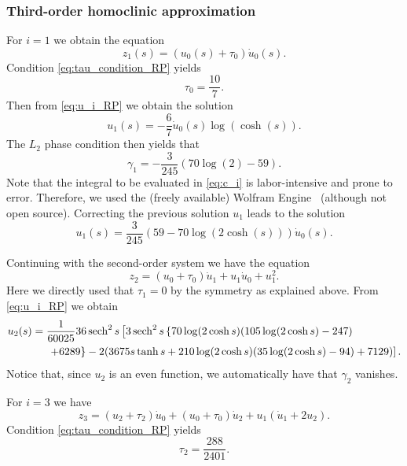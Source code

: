\subsubsection{Third-order homoclinic approximation}
\label{sec:third_order_homoclinic_approximation_RP}
For $i=1$ we obtain the equation
\begin{equation*}
    z_1(s) = (u_0(s)+\tau_0) \dot u_0(s).
\end{equation*}
Condition \cref{eq:tau_condition_RP} yields
\begin{equation*}
    \tau_0 = \frac{10}{7}.
\end{equation*}
Then from \cref{eq:u_i_RP} we obtain the solution
\begin{equation*}
    u_1(s) = -\frac{6}{7} \dot u_0(s) \log (\cosh (s)).
\end{equation*}
The $L_2$ phase condition then yields that
\[
\gamma_1 = -\frac{3}{245} (70 \log (2)-59)
.\] 
Note that the integral to be evaluated in \cref{eq:c_i} is labor-intensive and
prone to error.  Therefore, we used the (freely available) Wolfram
Engine~\cite{WolframEngine} (although not open source).  Correcting the
previous solution $u_1$ leads to the solution
\begin{equation*}
    u_1(s) = \frac{3}{245} (59-70 \log (2 \cosh (s))) \dot u_0(s).
\end{equation*}

Continuing with the second-order system we have the equation
\[
    z_2 = (u_0+\tau_0) \dot u_1+u_1 \dot u_0+u_1^2.
\] 
Here we directly used that $\tau_1=0$ by the symmetry as explained above.
From \cref{eq:u_i_RP} we obtain
\begin{align*}
    u_2(s) ={}& 
    \frac{1}{60025} 36 \operatorname{sech}^2 s  \left[3 \operatorname{sech}^2 s  \left\{70 \log (2 \cosh  s )
        (105 \log (2 \cosh s )-247) \right.\right. \\ 
              &{} \left.\left. +6289\right\}-2(3675 s \tanh  s +210 \log (2 \cosh  s )
              (35 \log (2 \cosh  s )-94)+7129)\right].
\end{align*}
Notice that, since $u_2$ is an even function, we automatically have that
$\gamma_2$ vanishes.

For $i=3$ we have
\begin{equation*}
    z_3 = (u_2+\tau _2) \dot u_0+(u_0+\tau _0) \dot u_2+u_1 \left(\dot u_1+2 u_2\right).
\end{equation*}
Condition \cref{eq:tau_condition_RP} yields
\begin{equation*}
    \tau_2 = \frac{288}{2401}.
\end{equation*}

